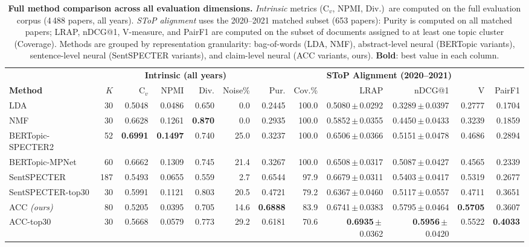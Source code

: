 \begin{table}[p]
\centering
\small
\setlength{\tabcolsep}{4pt}
\caption{\textbf{Full method comparison across all evaluation dimensions.} \emph{Intrinsic} metrics (C$_v$, NPMI, Div.)\ are computed on the full evaluation corpus (4\,488 papers, all years). \emph{SToP alignment} uses the 2020--2021 matched subset (653 papers): Purity is computed on all matched papers; LRAP, nDCG@1, V-measure, and PairF1 are computed on the subset of documents assigned to at least one topic cluster (Coverage). Methods are grouped by representation granularity: bag-of-words (LDA, NMF), abstract-level neural (BERTopic variants), sentence-level neural (SentSPECTER variants), and claim-level neural (ACC variants, ours). \textbf{Bold}: best value in each column.}
\label{tab:full_comparison_appendix}
\begin{tabular}{l r | r r r r | r r r r r r}
\toprule
 & & \multicolumn{4}{c|}{\textbf{Intrinsic (all years)}} & \multicolumn{6}{c}{\textbf{SToP Alignment (2020--2021)}} \\
\cmidrule(lr){3-6}\cmidrule(l){7-12}
\textbf{Method} & $K$ & C$_v$ & NPMI & Div. & Noise\% & Pur. & Cov.\% & LRAP & nDCG@1 & V & PairF1 \\
\midrule
LDA & 30 & 0.5048 & 0.0486 & 0.650 & 0.0 & 0.2445 & 100.0 & 0.5080{\scriptsize\,$\pm$\,0.0292} & 0.3289{\scriptsize\,$\pm$\,0.0397} & 0.2777 & 0.1704 \\
NMF & 30 & 0.6628 & 0.1261 & \textbf{0.870} & 0.0 & 0.2935 & 100.0 & 0.5852{\scriptsize\,$\pm$\,0.0355} & 0.4450{\scriptsize\,$\pm$\,0.0433} & 0.3239 & 0.1859 \\
\midrule
BERTopic-SPECTER2 & 52 & \textbf{0.6991} & \textbf{0.1497} & 0.740 & 25.0 & 0.3237 & 100.0 & 0.6506{\scriptsize\,$\pm$\,0.0366} & 0.5151{\scriptsize\,$\pm$\,0.0478} & 0.4686 & 0.2894 \\
BERTopic-MPNet & 60 & 0.6662 & 0.1309 & 0.745 & 21.4 & 0.3267 & 100.0 & 0.6508{\scriptsize\,$\pm$\,0.0317} & 0.5087{\scriptsize\,$\pm$\,0.0427} & 0.4565 & 0.2339 \\
\midrule
SentSPECTER & 187 & 0.5493 & 0.0655 & 0.559 & 2.7 & 0.6544 & 97.9 & 0.6679{\scriptsize\,$\pm$\,0.0311} & 0.5403{\scriptsize\,$\pm$\,0.0417} & 0.5319 & 0.2677 \\
SentSPECTER-top30 & 30 & 0.5991 & 0.1121 & 0.803 & 20.5 & 0.4721 & 79.2 & 0.6367{\scriptsize\,$\pm$\,0.0460} & 0.5117{\scriptsize\,$\pm$\,0.0557} & 0.4711 & 0.3651 \\
\midrule
ACC \textit{(ours)} & 80 & 0.5205 & 0.0395 & 0.705 & 14.6 & \textbf{0.6888} & 83.9 & 0.6741{\scriptsize\,$\pm$\,0.0383} & 0.5795{\scriptsize\,$\pm$\,0.0464} & \textbf{0.5705} & 0.3607 \\
ACC-top30 & 30 & 0.5668 & 0.0579 & 0.773 & 29.2 & 0.6181 & 70.6 & \textbf{0.6935}{\scriptsize\,$\pm$\,0.0362} & \textbf{0.5956}{\scriptsize\,$\pm$\,0.0420} & 0.5522 & \textbf{0.4033} \\
\bottomrule
\end{tabular}
\end{table}